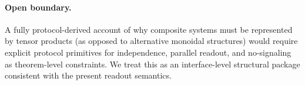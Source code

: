 \paragraph{Open boundary.}
\AuditTag A fully protocol-derived account of why composite systems must be represented by tensor products (as opposed to alternative monoidal structures) would require explicit protocol primitives for independence, parallel readout, and no-signaling as theorem-level constraints.
We treat this as an interface-level structural package consistent with the present readout semantics.
